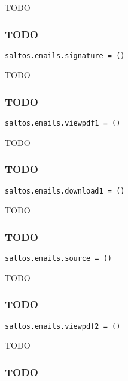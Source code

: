 \documentclass[a4paper]{article}
\begin{document}
TODO

\hypertarget{toc57}{}
\subsubsection{TODO}

\begin{lstlisting}
saltos.emails.signature = ()
\end{lstlisting}

TODO

\hypertarget{toc58}{}
\subsubsection{TODO}

\begin{lstlisting}
saltos.emails.viewpdf1 = ()
\end{lstlisting}

TODO

\hypertarget{toc59}{}
\subsubsection{TODO}

\begin{lstlisting}
saltos.emails.download1 = ()
\end{lstlisting}

TODO

\hypertarget{toc60}{}
\subsubsection{TODO}

\begin{lstlisting}
saltos.emails.source = ()
\end{lstlisting}

TODO

\hypertarget{toc61}{}
\subsubsection{TODO}

\begin{lstlisting}
saltos.emails.viewpdf2 = ()
\end{lstlisting}

TODO

\hypertarget{toc62}{}
\subsubsection{TODO}
\end{document}
